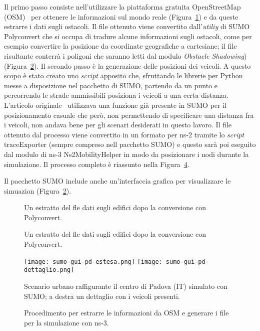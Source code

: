 Il primo passo consiste nell'utilizzare la piattaforma gratuita OpenStreetMap (OSM)~\cite{osmWebsite} per
ottenere le informazioni sul mondo reale (Figura~\ref{fig:esempio-file-osm}) e da queste estrarre i dati sugli ostacoli.
Il file ottenuto viene convertito dall'\textit{utiliy} di SUMO Polyconvert che si occupa di tradure alcune informazioni
sugli ostacoli, come per esempio convertire la posizione da coordinate geografiche a cartesiane;
il file risultante conterrà i poligoni che saranno letti dal modulo \textit{Obstacle Shadowing}) (Figura~\ref{fig:esempio-file-poly}).
Il secondo passo è la generazione delle posizioni dei veicoli.
A questo scopo è stato creato uno \textit{script} apposito che, sfruttando le librerie per Python messe a disposizione
nel pacchetto di SUMO, partendo da un punto e percorrendo le strade ammissibili posiziona i veicoli a una certa distanza.
L'articolo originale~\cite{Carpenter:2015:OMI:2756509.2756512} utilizzava una funzione già presente in SUMO
per il posizionamento casuale che però, non permettendo di specificare una distanza fra i veicoli, non andava bene per gli scenari desiderati in questo lavoro.
%
Il file ottenuto dal processo viene convertito in un formato per ns-2 tramite lo \textit{script} traceExporter (sempre compreso nell pacchetto SUMO)
e questo sarà poi eseguito dal modulo di ns-3 \textsf{Ns2MobilityHelper} in modo da posizionare i nodi durante la simulazione.
Il processo completo è riassunto nella Figura~\ref{fig:generazione-file-sumo}.

Il pacchetto SUMO include anche un'interfaccia grafica per visualizzare le simuazion (Figura~\ref{fig:esempio-file-poly}).
%
\begin{figure}[htbp]
	\centering
\caption{Un estratto del fle dati sugli edifici dopo la conversione con Polyconvert.\label{fig:esempio-file-osm}}
\end{figure}
%
%
\begin{figure}[htbp]
	\centering
\caption{Un estratto del fle dati sugli edifici dopo la conversione con Polyconvert.\label{fig:esempio-file-poly}}
\end{figure}
%
\begin{figure}[htbp]
	\centering
		\texttt{[image: sumo-gui-pd-estesa.png]}
		\hfill
		\texttt{[image: sumo-gui-pd-dettaglio.png]}
\caption{Scenario urbano raffigurante il centro di Padova (IT) simulato con SUMO; a destra un dettaglio con i veicoli presenti.\label{fig:sumo-gui}}
\end{figure}
%
\begin{figure}[htbp]
	\centering
	{
		\setlength{\fboxsep}{0pt}	%
	}
\caption{Procedimento per estrarre le informazioni da OSM e generare i file per la simulazione con ns-3.\label{fig:generazione-file-sumo}}
\end{figure}
